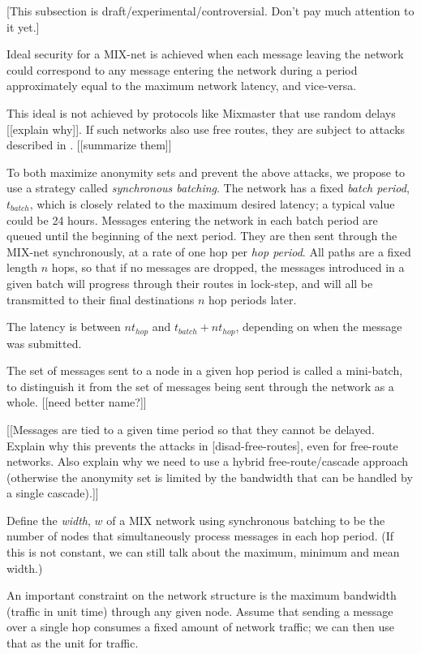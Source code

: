 \documentclass{llncs}
\begin{document}
[This subsection is draft/experimental/controversial. Don't pay much
attention to it yet.]

Ideal security for a MIX-net is achieved when each message leaving the
network could correspond to any message entering the network during a
period approximately equal to the maximum network latency, and vice-versa.

This ideal is not achieved by protocols like Mixmaster that use random
delays [[explain why]].
If such networks also use free routes, they are subject to attacks
described in \cite{disad-free-routes}. [[summarize them]]

To both maximize anonymity sets and prevent the above attacks, we
propose to use a strategy called {\em synchronous batching}.
The network has a fixed {\em batch period}, $t_{batch}$, which is closely
related to the maximum desired latency; a typical value could be 24 hours.
Messages entering the network in each batch period are queued until
the beginning of the next period. They are then sent through the MIX-net
synchronously, at a rate of one hop per {\em hop period}. All paths are
a fixed length $n$ hops, so that if no messages are dropped, the messages
introduced in a given batch will progress through their routes in
lock-step, and will all be transmitted to their final destinations $n$
hop periods later.

The latency is between $nt_{hop}$ and $t_{batch} + nt_{hop}$, depending
on when the message was submitted.

The set of messages sent to a node in a given hop period is called a
mini-batch, to distinguish it from the set of messages being sent
through the network as a whole. [[need better name?]]

[[Messages are tied to a given time period so that they cannot be delayed.
Explain why this prevents the attacks in [disad-free-routes], even
for free-route networks. Also explain why we need to use a hybrid
free-route/cascade approach (otherwise the anonymity set is limited by
the bandwidth that can be handled by a single cascade).]]

Define the {\em width}, $w$ of a MIX network using synchronous batching to
be the number of nodes that simultaneously process messages in each
hop period. (If this is not constant, we can still talk about the
maximum, minimum and mean width.)

An important constraint on the network structure is the maximum
bandwidth (traffic in unit time) through any given node.
Assume that sending a message over a single hop consumes a fixed
amount of network traffic; we can then use that as the unit for
traffic.
\end{document}
